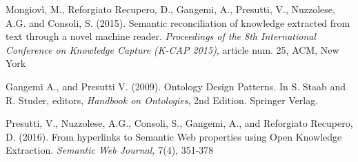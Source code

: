 \documentclass[runningheads,a4paper]{llncs}
\begin{document}
\begin{thebibliography}{4}
Mongiov\`i, M., Reforgiato Recupero, D., Gangemi, A., Presutti, V., Nuzzolese, A.G. and Consoli, S. (2015). Semantic reconciliation of knowledge extracted from text through a novel machine reader. {\em Proceedings of the 8th International Conference on Knowledge Capture (K-CAP 2015)}, article num. 25, ACM, New York

Gangemi A., and Presutti V. (2009). Ontology Design Patterns. In S. Staab and R. Studer, editors, {\em Handbook on Ontologies}, 2nd Edition. Springer Verlag. 

Presutti, V., Nuzzolese, A.G., Consoli, S., Gangemi, A., and Reforgiato Recupero, D. (2016). From hyperlinks to Semantic Web properties using Open Knowledge Extraction. {\em Semantic Web Journal,} 7(4), 351-378

\end{thebibliography}
\end{document}
